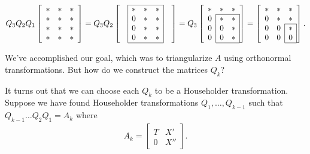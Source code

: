 \begin{equation*}
Q_3 Q_2 Q_1
\left[\begin{array}{ccc}
* & * & * \\
* & * & * \\
* & * & * \\
* & * & *
\end{array}\right]
= Q_3 Q_2
\left[\begin{array}{ccccc}
\cline{2-4}
& \lvl{*} & * & \rvl{*} & \\
& \lvl{0} & * & \rvl{*}& \\
& \lvl{0} & * & \rvl{*} & \\
& \lvl{0} & * & \rvl{*} & \\ \cline{2-4}
\end{array}\right]
= Q_3
\left[\begin{array}{ccc}
     *  & * &      * \\
\cline{2-3}
\rvl{0} & * & \rvl{*} \\
\rvl{0} & 0 & \rvl{*} \\
\rvl{0} & 0 & \rvl{*} \\
\cline{2-3}
\end{array}\right]
=
\left[\begin{array}{ccc}
* & * & * \\
0 & * & * \\
\cline{3-3}
0 & \rvl{0} & \rvl{*} \\
0 & \rvl{0} & \rvl{0} \\
\cline{3-3}
\end{array}\right].
\end{equation*}

We've accomplished our goal, which was to triangularize $A$ using orthonormal transformations.
But how do we construct the matrices $Q_k$?

It turns out that we can choose each $Q_k$ to be a Householder transformation.
Suppose we have found Householder transformations $Q_1, \ldots, Q_{k-1}$ such that $Q_{k-1}\ldots Q_2Q_1 = A_k$ where
%
\begin{align*}
A_k =
\left[\begin{array}{cc}
T & X' \\
0 & X''
\end{array}\right].
\end{align*}

